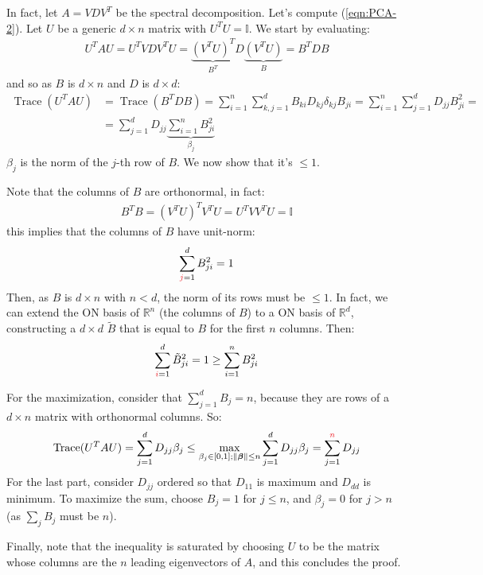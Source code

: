 \documentclass[../template.tex]{subfiles}
\begin{document}
\begin{itemize}
    In fact, let $A = VDV^T$ be the spectral decomposition. Let's compute (\ref{eqn:PCA-2}). Let $U$ be a generic $d\times n$ matrix with $U^T U = \mathbb{I}$. We start by evaluating:
    \begin{align*}
        U^T A U = U^T VDV^T U = \underbrace{(V^T U)^T}_{B^T}  D \underbrace{(V^TU)}_{B} = B^T D B
    \end{align*}
    and so as $B$ is $d \times n$ and $D$ is $d\times d$:
    \begin{align*}
        \operatorname{Trace}(U^T A U) &= \operatorname{Trace}(B^T D B) = \sum_{i=1}^n \sum_{k,j=1}^d B_{ki} D_{kj}\delta_{kj} B_{ji} = \sum_{i=1}^n \sum_{j=1}^d D_{jj} B_{ji}^2 =\\
        &= \sum_{j=1}^d D_{jj} \underbrace{\sum_{i=1}^n B_{ji}^2}_{\beta_j} 
    \end{align*}
    $\beta_j$ is the norm of the $j$-th row of $B$. We now show that it's $\leq 1$.

    Note that the columns of $B$ are orthonormal, in fact:
    \begin{align*}
        B^T B = (V^T U)^T V^T U = U^T V V^T U = \mathbb{I}
    \end{align*}
    this implies that the columns of $B$ have unit-norm:
    \begin{align*}
        \sum_{\textcolor{Red}{j}=1}^d B_{ji}^2 = 1 
    \end{align*}
    Then, as $B$ is $d \times n$ with $n < d$, the norm of its rows must be $\leq 1$. In fact, we can extend the ON basis of $\mathbb{R}^n$ (the columns of $B$) to a ON basis of $\mathbb{R}^d$, constructing a $d\times d$ $\tilde{B}$ that is equal to $B$ for the first $n$ columns. Then:
    \begin{align*}
        \sum_{\textcolor{Red}{i}=1}^d \tilde{B}_{ji}^2 = 1 \geq \sum_{i=1}^n B_{ji}^2
    \end{align*}

    For the maximization, consider that $\sum_{j=1}^d B_j= n$, because they are rows of a $d \times n$ matrix with orthonormal columns. So:
    \begin{align*}
        \operatorname{Trace}(U^T A U) = \sum_{j=1}^d D_{jj} \beta_j \leq \max_{\beta_j \in [0,1]; \norm{\bm{\beta}} \leq n} \sum_{j=1}^d D_{jj} \beta_j = \sum_{j=1}^{\textcolor{Red}{n}} D_{jj}
    \end{align*}
    For the last part, consider $D_{jj}$ ordered so that $D_{11}$ is maximum and $D_{d d}$ is minimum. To maximize the sum, choose $B_j = 1$ for $j\leq n$, and $\beta_j = 0$ for $j > n$ (as $\sum_j B_j$ must be $n$).  

    Finally, note that the inequality is saturated by choosing $U$ to be the matrix whose columns are the $n$ leading eigenvectors of $A$, and this concludes the proof.
\end{itemize}
\end{document}
